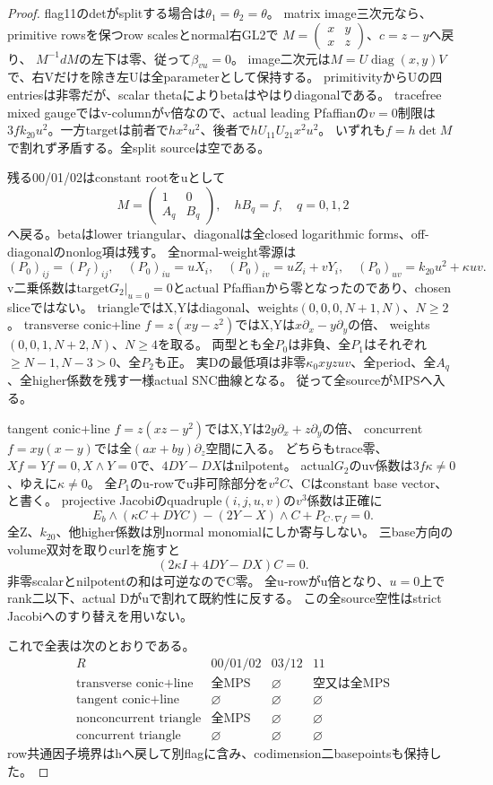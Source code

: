 \documentclass[a4paper,11pt]{ltjsarticle}
\theoremstyle{definition}
\begin{document}
\begin{proof}
flag11のdetがsplitする場合は$\theta_1=\theta_2=\theta$。
matrix image三次元なら、primitive rowsを保つrow scalesとnormal右GL2で
$M=\left(\begin{smallmatrix}x&y\\x&z\end{smallmatrix}\right)$、$c=z-y$へ戻り、
$M^{-1}dM$の左下は零、従って$\beta_{vu}=0$。
image二次元は$M=U\operatorname{diag}(x,y)V$で、右Vだけを除き左Uは全parameterとして保持する。
primitivityからUの四entriesは非零だが、scalar thetaによりbetaはやはりdiagonalである。
tracefree mixed gaugeではv-columnがv倍なので、actual leading Pfaffianの$v=0$制限は
$3f k_{20}u^2$。一方targetは前者で$hx^2u^2$、後者で$hU_{11}U_{21}x^2u^2$。
いずれも$f=h\det M$で割れず矛盾する。全split sourceは空である。

残る00/01/02はconstant rootをuとして
\[
 M=\begin{pmatrix}1&0\\A_q&B_q\end{pmatrix},\quad hB_q=f,
 \quad q=0,1,2
\]
へ戻る。betaはlower triangular、diagonalは全closed logarithmic forms、off-diagonalのnonlog項は残す。
全normal-weight零源は
\[
 (P_0)_{ij}=(P_f)_{ij},\quad
 (P_0)_{iu}=uX_i,\quad(P_0)_{iv}=uZ_i+vY_i,\quad
 (P_0)_{uv}=k_{20}u^2+\kappa uv.
\]
v二乗係数はtarget$G_2|_{u=0}=0$とactual Pfaffianから零となったのであり、chosen sliceではない。
triangleではX,Yはdiagonal、weights$(0,0,0,N+1,N)$、$N\ge2$。
transverse conic+line $f=z(xy-z^2)$ではX,Yは$x\partial_x-y\partial_y$の倍、
weights$(0,0,1,N+2,N)$、$N\ge4$を取る。
両型とも全$P_0$は非負、全$P_1$はそれぞれ$\ge N-1,N-3>0$、全$P_2$も正。
実Dの最低項は非零$\kappa_0 xyzuv$、全period、全$A_q$、全higher係数を残す一様actual SNC曲線となる。
従って全sourceがMPSへ入る。

tangent conic+line $f=z(xz-y^2)$ではX,Yは$2y\partial_x+z\partial_y$の倍、
concurrent $f=xy(x-y)$では全$(ax+by)\partial_z$空間に入る。
どちらもtrace零、$Xf=Yf=0,X\wedge Y=0$で、$4DY-DX$はnilpotent。
actual$G_2$のuv係数は$3f\kappa\ne0$、ゆえに$\kappa\ne0$。
全$P_1$のu-rowでu非可除部分を$v^2C$、Cはconstant base vector、と書く。
projective Jacobiのquadruple$(i,j,u,v)$の$v^3$係数は正確に
\[
 E_b\wedge(\kappa C+DY C)-(2Y-X)\wedge C+P_{C\cdot\nabla f}=0.
\]
全Z、$k_{20}$、他higher係数は別normal monomialにしか寄与しない。
三base方向のvolume双対を取りcurlを施すと
\[
 (2\kappa I+4DY-DX)C=0.
\]
非零scalarとnilpotentの和は可逆なのでC零。
全u-rowがu倍となり、$u=0$上でrank二以下、actual Dがuで割れて既約性に反する。
この全source空性はstrict Jacobiへのすり替えを用いない。

これで全表は次のとおりである。
\[
\begin{array}{c|c|c|c}
R&00/01/02&03/12&11\\\hline
\text{transverse conic+line}&\text{全MPS}&\varnothing&\text{空又は全MPS}\\
\text{tangent conic+line}&\varnothing&\varnothing&\varnothing\\
\text{nonconcurrent triangle}&\text{全MPS}&\varnothing&\varnothing\\
\text{concurrent triangle}&\varnothing&\varnothing&\varnothing
\end{array}
\]
row共通因子境界はhへ戻して別flagに含み、codimension二basepointsも保持した。
\end{proof}
\end{document}
